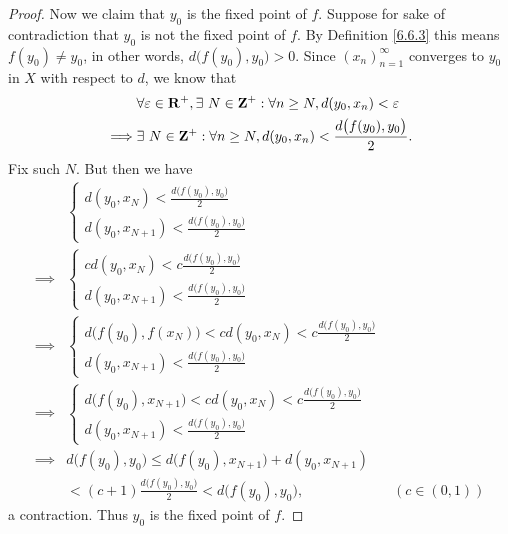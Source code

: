 \begin{proof}
    Now we claim that \(y_0\) is the fixed point of \(f\).
    Suppose for sake of contradiction that \(y_0\) is not the fixed point of \(f\).
    By Definition \ref{6.6.3} this means \(f(y_0) \neq y_0\), in other words, \(d\big(f(y_0), y_0\big) > 0\).
    Since \((x_n)_{n = 1}^\infty\) converges to \(y_0\) in \(X\) with respect to \(d\), we know that
    \begin{align*}
                 & \forall \varepsilon \in \mathbf{R}^+, \exists\ N \in \mathbf{Z}^+ : \forall n \geq N, d(y_0, x_n) < \varepsilon \\
        \implies & \exists\ N \in \mathbf{Z}^+ : \forall n \geq N, d(y_0, x_n) < \frac{d\big(f(y_0), y_0\big)}{2}.
    \end{align*}
    Fix such \(N\).
    But then we have
    \begin{align*}
                 & \begin{cases}
                       d(y_0, x_N) < \frac{d\big(f(y_0), y_0\big)}{2} \\
                       d(y_0, x_{N + 1}) < \frac{d\big(f(y_0), y_0\big)}{2}
                   \end{cases}                                                   \\
        \implies & \begin{cases}
                       c d(y_0, x_N) < c \frac{d\big(f(y_0), y_0\big)}{2} \\
                       d(y_0, x_{N + 1}) < \frac{d\big(f(y_0), y_0\big)}{2}
                   \end{cases}                                                   \\
        \implies & \begin{cases}
                       d\big(f(y_0), f(x_N)\big) < c d(y_0, x_N) < c \frac{d\big(f(y_0), y_0\big)}{2} \\
                       d(y_0, x_{N + 1}) < \frac{d\big(f(y_0), y_0\big)}{2}
                   \end{cases}                        \\
        \implies & \begin{cases}
                       d\big(f(y_0), x_{N + 1}\big) < c d(y_0, x_N) < c \frac{d\big(f(y_0), y_0\big)}{2} \\
                       d(y_0, x_{N + 1}) < \frac{d\big(f(y_0), y_0\big)}{2}
                   \end{cases}                     \\
        \implies & d\big(f(y_0), y_0\big) \leq d\big(f(y_0), x_{N + 1}\big) + d(y_0, x_{N + 1})                          \\
                 & < (c + 1) \frac{d\big(f(y_0), y_0\big)}{2} < d\big(f(y_0), y_0\big),                 & (c \in (0, 1))
    \end{align*}
    a contraction.
    Thus \(y_0\) is the fixed point of \(f\).
\end{proof}

